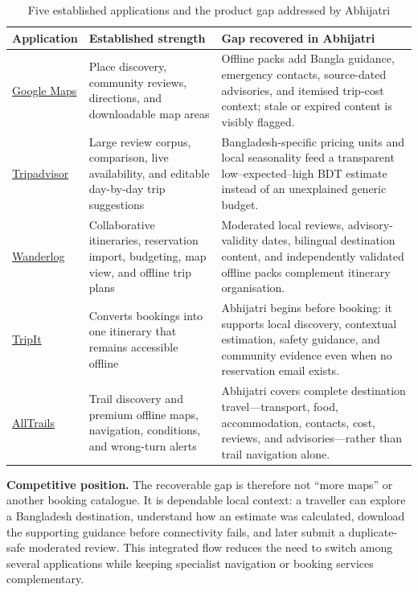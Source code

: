\documentclass[11pt,a4paper]{article}
\newcommand{\hd}[1]{\textbf{#1}}
\begin{document}
\begin{table}[H]
\centering
\small
\caption{Five established applications and the product gap addressed by Abhijatri}\label{tab:market-gap}
\begin{tabularx}{\textwidth}{L{25mm}L{42mm}Y}
\toprule
\hd{Application} & \hd{Established strength} & \hd{Gap recovered in Abhijatri} \\
\midrule
\href{https://support.google.com/maps/answer/6291838}{Google Maps} & Place discovery, community reviews, directions, and downloadable map areas & Offline packs add Bangla guidance, emergency contacts, source-dated advisories, and itemised trip-cost context; stale or expired content is visibly flagged. \\
\href{https://www.tripadvisor.com/AIAssistant}{Tripadvisor} & Large review corpus, comparison, live availability, and editable day-by-day trip suggestions & Bangladesh-specific pricing units and local seasonality feed a transparent low--expected--high BDT estimate instead of an unexplained generic budget. \\
\href{https://wanderlog.com/}{Wanderlog} & Collaborative itineraries, reservation import, budgeting, map view, and offline trip plans & Moderated local reviews, advisory-validity dates, bilingual destination content, and independently validated offline packs complement itinerary organisation. \\
\href{https://www.tripit.com/web/free/trip-planner}{TripIt} & Converts bookings into one itinerary that remains accessible offline & Abhijatri begins before booking: it supports local discovery, contextual estimation, safety guidance, and community evidence even when no reservation email exists. \\
\href{https://www.alltrails.com/welcome}{AllTrails} & Trail discovery and premium offline maps, navigation, conditions, and wrong-turn alerts & Abhijatri covers complete destination travel---transport, food, accommodation, contacts, cost, reviews, and advisories---rather than trail navigation alone. \\
\bottomrule
\end{tabularx}
\end{table}

\textbf{Competitive position.} The recoverable gap is therefore not ``more maps'' or another booking catalogue. It is dependable local context: a traveller can explore a Bangladesh destination, understand how an estimate was calculated, download the supporting guidance before connectivity fails, and later submit a duplicate-safe moderated review. This integrated flow reduces the need to switch among several applications while keeping specialist navigation or booking services complementary.
\end{document}
